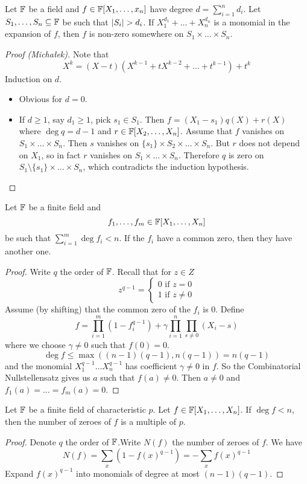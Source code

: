 \documentclass{article}
\begin{document}
\begin{nthm}
  Let $\mathbb F$ be a field and $f \in \mathbb F[X_1, \dots, x_n]$ have degree $d = \sum_{i = 1}^n d_i$. Let $S_1, \dots, S_n \subseteq \mathbb F$ be such that $\left\lvert S_i\right\rvert > d_i$. If $X_1^{d_1} + \dots + X_n^{d_n}$ is a monomial in the expansion of $f$, then $f$ is non-zero somewhere on $S_1 \times \dots \times S_n$.
\end{nthm}
\begin{proof}[Proof (Michałek)]
  Note that
  $$X^k = (X - t)(X^{k - 1} + tX^{k - 2} + \dots + t^{k - 1}) + t^k$$
  Induction on $d$.
  \begin{itemize}
    \item Obvious for $d = 0$.
    \item If $d \ge 1$, say $d_1 \ge 1$, pick $s_1 \in S_1$. Then $f = (X_1 - s_1)q(X) + r(X)$ where $\deg q = d - 1$ and $r \in \mathbb F[X_2, \dots, X_n]$. Assume that $f$ vanishes on $S_1 \times \dots \times S_n$. Then $s$ vanishes on $\{s_1\} \times S_2 \times \dots \times S_n$. But $r$ does not depend on $X_1$, so in fact $r$ vanishes on $S_1 \times \dots \times S_n$. Therefore $q$ is zero on $S_1 \setminus \{s_1\} \times \dots \times S_n$, which contradicts the induction hypothesis.
  \end{itemize}
\end{proof}

\begin{nthm}
  Let $\mathbb F$ be a finite field and
  $$f_1, \dots, f_m \in \mathbb F[X_1, \dots, X_n]$$
  be such that $\sum_{i = 1}^m \deg f_i < n$. If the $f_i$ have a common zero, then they have another one.
\end{nthm}
\begin{proof}
  Write $q$ the order of $\mathbb F$. Recall that for $z \in Z$
  $$z^{q - 1} = \begin{cases*}
    0 \text{ if } z = 0 \\
    1 \text{ if } z \ne 0
  \end{cases*}$$
  Assume (by shifting) that the common zero of the $f_i$ is $0$. Define
  $$f = \prod_{i = 1}^m (1 - f_i^{q - 1}) + \gamma \prod_{i = 1}^n \prod_{s \ne 0} (X_i - s)$$
  where we choose $\gamma \ne 0$ such that $f(0) = 0$.
  $$\deg f \le \max((n - 1)(q - 1), n(q - 1)) = n(q - 1)$$
  and the monomial $X_1^{q - 1} \dots X_n^{q - 1}$ has coefficient $\gamma \ne 0$ in $f$. So the Combinatorial Nullstellensatz gives us $a$ such that $f(a) \ne 0$. Then $a \ne 0$ and $f_1(a) = \dots = f_m(a) = 0$.
\end{proof}

\begin{nthm}
  Let $\mathbb F$ be a finite field of characteristic $p$. Let $f \in \mathbb F[X_1, \dots, X_n]$. If $\deg f < n$, then the number of zeroes of $f$ is a multiple of $p$.
\end{nthm}
\begin{proof}
  Denote $q$ the order of $\mathbb F$.Write $N(f)$ the number of zeroes of $f$. We have
  $$N(f) = \sum_x(1 - f(x)^{q - 1}) = - \sum_x f(x)^{q - 1}$$
  Expand $f(x)^{q - 1}$ into monomials of degree at most $(n - 1)(q - 1)$.
\end{proof}

\newlec

\printindex
\end{document}
